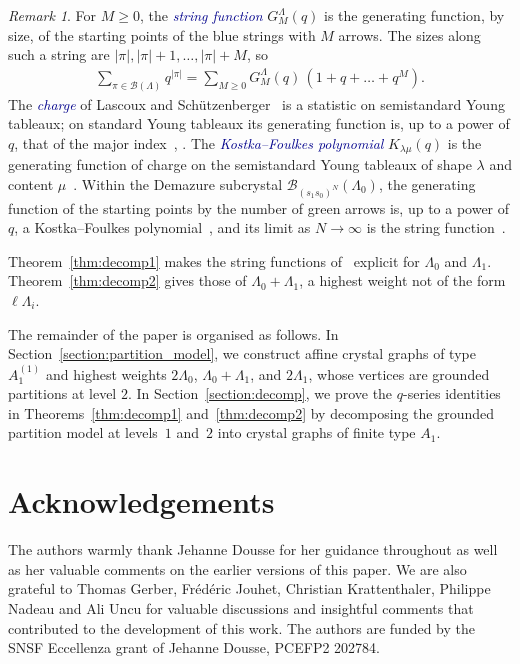 \documentclass[11pt]{article}
\theoremstyle{definition}
\theoremstyle{remark}
\newtheorem{remark}[theorem]{Remark}
\theoremstyle{definition}
\numberwithin{equation}{section}
\renewcommand\emph[1]{\textcolor{darkblue}{\it #1}}
\begin{document}
\begin{remark}
For $M\geq0$, the \emph{string function} $G^{\Lambda}_M(q)$ is the generating function, by size, of the starting points of the blue strings with $M$ arrows. The sizes along such a string are $|\pi|,|\pi|+1,\dots,|\pi|+M$, so
\begin{align}\label{eq:string_decomp}
\sum_{\pi\in\mathcal{B}(\Lambda)} q^{|\pi|} = \sum_{M\geq0} G^{\Lambda}_M(q)\,(1+q+\dots+q^{M}).
\end{align}
The \emph{charge} of Lascoux and Schützenberger~\cite{LS78} is a statistic on semistandard Young tableaux; on standard Young tableaux its generating function is, up to a power of $q$, that of the major index~\cite[Chapter~III, Section~6, Example~2]{Mac95}, \cite[Corollary~7.21.5]{Sta1}. The \emph{Kostka--Foulkes polynomial} $K_{\lambda\mu}(q)$ is the generating function of charge on the semistandard Young tableaux of shape $\lambda$ and content $\mu$~\cite{LS78}. Within the Demazure subcrystal $\mathcal{B}_{(s_1s_0)^N}(\Lambda_0)$, the generating function of the starting points by the number of green arrows is, up to a power of $q$, a Kostka--Foulkes polynomial~\cite[Theorem~5.1]{KMOTU00}, and its limit as $N\to\infty$ is the string function~\cite[Theorem~1.1]{NY97}.

Theorem~\ref{thm:decomp1} makes the string functions of~\cite[Theorem~1.1, p.~550, and Corollary~4.8, p.~572]{NY97} explicit for $\Lambda_0$ and $\Lambda_1$. Theorem~\ref{thm:decomp2} gives those of $\Lambda_0+\Lambda_1$, a highest weight not of the form $\ell\Lambda_i$.
\end{remark}

The remainder of the paper is organised as follows. In Section~\ref{section:partition_model}, we construct affine crystal graphs of type~$A_1^{(1)}$ and highest weights $2\Lambda_0$, $\Lambda_0+\Lambda_1$, and $2\Lambda_1$, whose vertices are grounded partitions at level \( 2 \). In Section~\ref{section:decomp}, we prove the $q$-series identities in Theorems~\ref{thm:decomp1} and~\ref{thm:decomp2} by decomposing the grounded partition model at levels~$1$ and~$2$ into crystal graphs of finite type \( A_1 \).

\section*{Acknowledgements}

The authors warmly thank Jehanne Dousse for her guidance throughout as well as her valuable comments on the earlier versions of this paper. We are also grateful to Thomas Gerber, Frédéric Jouhet, Christian Krattenthaler, Philippe Nadeau and Ali Uncu for valuable discussions and insightful comments that contributed to the development of this work. The authors are funded by the SNSF Eccellenza grant of Jehanne Dousse, PCEFP2 202784.
\end{document}
